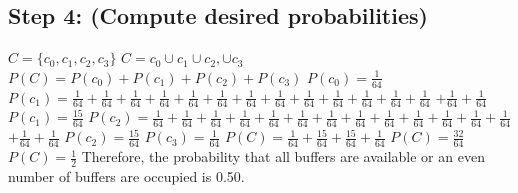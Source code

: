 \documentclass[a4paper,10pt]{article}
\begin{document}
\subsection{Step 4: (Compute desired probabilities)}
$ C = \{c_{0}, c_{1}, c_{2}, c_{3}\} $ \newline
$ C = c_{0} \cup c_{1} \cup c_{2}, \cup c_{3} $ \newline
$ P(C) = P(c_{0}) + P(c_{1}) + P(c_{2}) + P(c_{3}) $ \newline
$ P(c_{0}) = \frac{1}{64} $ \newline
$ P(c_{1}) = \frac{1}{64} + \frac{1}{64} + \frac{1}{64} + \frac{1}{64} + \frac{1}{64} + \frac{1}{64} + 
\frac{1}{64} + \frac{1}{64} + \frac{1}{64} + \frac{1}{64} + \frac{1}{64} + \frac{1}{64} + \frac{1}{64} $ \newline  
$ + \frac{1}{64} + \frac{1}{64} $ \newline
$ P(c_{1}) = \frac{15}{64} $ \newline
$ P(c_{2}) = \frac{1}{64} + \frac{1}{64} + \frac{1}{64} + \frac{1}{64} + \frac{1}{64} + \frac{1}{64} +
\frac{1}{64} + \frac{1}{64} + \frac{1}{64} + \frac{1}{64} + \frac{1}{64} + \frac{1}{64} + \frac{1}{64} $ \newline
$ + \frac{1}{64} + \frac{1}{64} $ \newline 
$ P(c_{2}) = \frac{15}{64} $ \newline
$ P(c_{3}) = \frac{1}{64} $ \newline
$ P(C) = \frac{1}{64} + \frac{15}{64} + \frac{15}{64} + \frac{1}{64} $ \newline
$ P(C) = \frac{32}{64} $ \newline
$ P(C) = \frac{1}{2} $ \newline
Therefore, the probability that all buffers are available or an even number of buffers are occupied is 0.50. \newline
\end{document}
